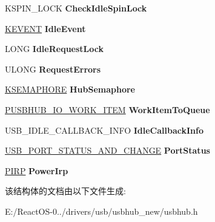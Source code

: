 \begin{DoxyCompactItemize}
K\+S\+P\+I\+N\+\_\+\+L\+O\+CK {\bfseries Check\+Idle\+Spin\+Lock}
\item 
\mbox{\label{struct___u_s_b_h_u_b___f_d_o___e_x_t_e_n_s_i_o_n_a26153f5d177e00ff57e929d554aac37e}} 
\hyperlink{struct___k_e_v_e_n_t}{K\+E\+V\+E\+NT} {\bfseries Idle\+Event}
\item 
\mbox{\label{struct___u_s_b_h_u_b___f_d_o___e_x_t_e_n_s_i_o_n_a5e830b5ede03543a5b641ef7c257add1}} 
L\+O\+NG {\bfseries Idle\+Request\+Lock}
\item 
\mbox{\label{struct___u_s_b_h_u_b___f_d_o___e_x_t_e_n_s_i_o_n_a869685ffdf05adcbb6e88755ac785804}} 
U\+L\+O\+NG {\bfseries Request\+Errors}
\item 
\mbox{\label{struct___u_s_b_h_u_b___f_d_o___e_x_t_e_n_s_i_o_n_a2673d7e3561fa77deaf8bd52e1706f2e}} 
\hyperlink{struct___k_s_e_m_a_p_h_o_r_e}{K\+S\+E\+M\+A\+P\+H\+O\+RE} {\bfseries Hub\+Semaphore}
\item 
\mbox{\label{struct___u_s_b_h_u_b___f_d_o___e_x_t_e_n_s_i_o_n_a7c274648b5c160c3648e46993db3a3d6}} 
\hyperlink{struct___u_s_b_h_u_b___i_o___w_o_r_k___i_t_e_m}{P\+U\+S\+B\+H\+U\+B\+\_\+\+I\+O\+\_\+\+W\+O\+R\+K\+\_\+\+I\+T\+EM} {\bfseries Work\+Item\+To\+Queue}
\item 
\mbox{\label{struct___u_s_b_h_u_b___f_d_o___e_x_t_e_n_s_i_o_n_a8f1fcccd9552e511721a8f9c8ca4189a}} 
U\+S\+B\+\_\+\+I\+D\+L\+E\+\_\+\+C\+A\+L\+L\+B\+A\+C\+K\+\_\+\+I\+N\+FO {\bfseries Idle\+Callback\+Info}
\item 
\mbox{\label{struct___u_s_b_h_u_b___f_d_o___e_x_t_e_n_s_i_o_n_a37d720f7c378fdb8e4c41d9baa342ba0}} 
\hyperlink{union___u_s_b___p_o_r_t___s_t_a_t_u_s___a_n_d___c_h_a_n_g_e}{U\+S\+B\+\_\+\+P\+O\+R\+T\+\_\+\+S\+T\+A\+T\+U\+S\+\_\+\+A\+N\+D\+\_\+\+C\+H\+A\+N\+GE} {\bfseries Port\+Status}
\item 
\mbox{\label{struct___u_s_b_h_u_b___f_d_o___e_x_t_e_n_s_i_o_n_ad6c3c72001d3a03045e4dab6fedd46ec}} 
\hyperlink{interfacevoid}{P\+I\+RP} {\bfseries Power\+Irp}
\end{DoxyCompactItemize}


该结构体的文档由以下文件生成\+:\begin{DoxyCompactItemize}
\item 
E\+:/\+React\+O\+S-\/0../drivers/usb/usbhub\+\_\+new/usbhub.\+h\end{DoxyCompactItemize}
